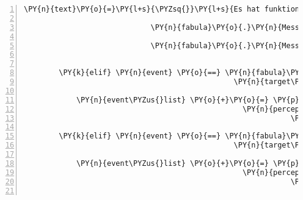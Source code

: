 \begin{Verbatim}[commandchars=\\\{\},numbers=left,firstnumber=1,stepnumber=1]
                                                              \PY{n}{text}\PY{o}{=}\PY{l+s}{\PYZsq{}}\PY{l+s}{Es hat funktioniert jetzt haben wir eine }\PY{l+s}{\PYZsq{}}
                                                                   \PY{l+s}{\PYZsq{}}\PY{l+s}{spielbare Laute.}\PY{l+s}{\PYZsq{}}\PY{p}{)}\PY{p}{]}\PY{p}{)}\PY{p}{,}
                             \PY{n}{fabula}\PY{o}{.}\PY{n}{Message}\PY{p}{(}\PY{p}{[}\PY{n}{fabula}\PY{o}{.}\PY{n}{PicksUpEvent}\PY{p}{(}\PY{n}{identifier}\PY{o}{=}\PY{n}{ID\PYZus{}CASSANDRA}\PY{p}{,}
                                                                 \PY{n}{item\PYZus{}identifier}\PY{o}{=}\PY{l+s}{\PYZsq{}}\PY{l+s}{lute}\PY{l+s}{\PYZsq{}}\PY{p}{)}\PY{p}{]}\PY{p}{)}\PY{p}{,}
                             \PY{n}{fabula}\PY{o}{.}\PY{n}{Message}\PY{p}{(}\PY{p}{[}\PY{n}{fabula}\PY{o}{.}\PY{n}{PerceptionEvent}\PY{p}{(}\PY{n}{identifier}\PY{o}{=}\PY{n}{ID\PYZus{}KUNI}\PY{p}{,}
                                                                    \PY{n}{perception}\PY{o}{=}\PY{l+s}{\PYZsq{}}\PY{l+s}{Cassandra hat die Laute eingesteckt.}\PY{l+s}{\PYZsq{}}\PY{p}{)}\PY{p}{]}\PY{p}{)}\PY{p}{]}

        \PY{k}{elif} \PY{n}{event} \PY{o}{==} \PY{n}{fabula}\PY{o}{.}\PY{n}{TriesToLookAtEvent}\PY{p}{(}\PY{n}{identifier}\PY{o}{=}\PY{n}{ID\PYZus{}KUNI}\PY{p}{,}
                                                \PY{n}{target\PYZus{}identifier}\PY{o}{=}\PY{l+s}{\PYZsq{}}\PY{l+s}{guardian}\PY{l+s}{\PYZsq{}}\PY{p}{)}\PY{p}{:}

            \PY{n}{event\PYZus{}list} \PY{o}{+}\PY{o}{=} \PY{p}{[}\PY{n}{fabula}\PY{o}{.}\PY{n}{PerceptionEvent}\PY{p}{(}\PY{n}{identifier}\PY{o}{=}\PY{n}{ID\PYZus{}KUNI}\PY{p}{,}
                                                  \PY{n}{perception}\PY{o}{=}\PY{l+s}{\PYZsq{}}\PY{l+s}{Ein ziemlich großer, grobschlächtiger Kerl, }\PY{l+s}{\PYZsq{}}
                                                             \PY{l+s}{\PYZsq{}}\PY{l+s}{der den Eingang zum Zauberwald bewacht.}\PY{l+s}{\PYZsq{}}\PY{p}{)}\PY{p}{]}

        \PY{k}{elif} \PY{n}{event} \PY{o}{==} \PY{n}{fabula}\PY{o}{.}\PY{n}{TriesToLookAtEvent}\PY{p}{(}\PY{n}{identifier}\PY{o}{=}\PY{n}{ID\PYZus{}CASSANDRA}\PY{p}{,}
                                                \PY{n}{target\PYZus{}identifier}\PY{o}{=}\PY{l+s}{\PYZsq{}}\PY{l+s}{guardian}\PY{l+s}{\PYZsq{}}\PY{p}{)}\PY{p}{:}

            \PY{n}{event\PYZus{}list} \PY{o}{+}\PY{o}{=} \PY{p}{[}\PY{n}{fabula}\PY{o}{.}\PY{n}{PerceptionEvent}\PY{p}{(}\PY{n}{identifier}\PY{o}{=}\PY{n}{ID\PYZus{}CASSANDRA}\PY{p}{,}
                                                  \PY{n}{perception}\PY{o}{=}\PY{l+s}{\PYZsq{}}\PY{l+s}{Der Eingang zum Zauberwald wird von einem Wächter }\PY{l+s}{\PYZsq{}}
                                                             \PY{l+s}{\PYZsq{}}\PY{l+s}{bewacht, der sieht ganz schön ungemütlich aus.}\PY{l+s}{\PYZsq{}}\PY{p}{)}\PY{p}{]}


\end{Verbatim}
